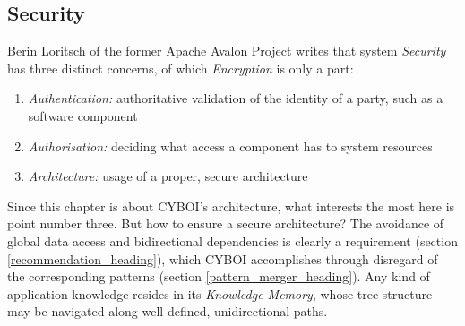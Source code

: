 %
%
%
%
%
%
%

\subsection{Security}
\label{security_heading}

Berin Loritsch of the former Apache Avalon Project \cite{avalon} writes that
system \emph{Security} has three distinct concerns, of which \emph{Encryption}
is only a part:

\begin{enumerate}
    \item \emph{Authentication:} authoritative validation of the identity of a
        party, such as a software component
    \item \emph{Authorisation:} deciding what access a component has to system
        resources
    \item \emph{Architecture:} usage of a proper, secure architecture
\end{enumerate}

Since this chapter is about CYBOI's architecture, what interests the most here
is point number three. But how to ensure a secure architecture? The avoidance
of global data access and bidirectional dependencies is clearly a requirement
(section \ref{recommendation_heading}), which CYBOI accomplishes through
disregard of the corresponding patterns (section \ref{pattern_merger_heading}).
Any kind of application knowledge resides in its \emph{Knowledge Memory}, whose
tree structure may be navigated along well-defined, unidirectional paths.

